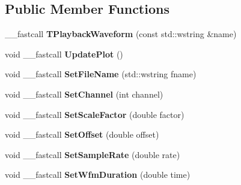 \subsection*{Public Member Functions}
\begin{DoxyCompactItemize}
\item 
\hypertarget{class_t_playback_waveform_aa7c520646204d2c8287fa19096c99172}{\+\_\+\+\_\+fastcall {\bfseries T\+Playback\+Waveform} (const std\+::wstring \&name)}\label{class_t_playback_waveform_aa7c520646204d2c8287fa19096c99172}

\item 
\hypertarget{class_t_playback_waveform_a5aed28140f1fda7df687a83899589e41}{void \+\_\+\+\_\+fastcall {\bfseries Update\+Plot} ()}\label{class_t_playback_waveform_a5aed28140f1fda7df687a83899589e41}

\item 
\hypertarget{class_t_playback_waveform_a3be6b2c54ae80df5df54ac0b1da24d5d}{void \+\_\+\+\_\+fastcall {\bfseries Set\+File\+Name} (std\+::wstring fname)}\label{class_t_playback_waveform_a3be6b2c54ae80df5df54ac0b1da24d5d}

\item 
\hypertarget{class_t_playback_waveform_ae4e5af610750ab71d5ba0beffa2132e4}{void \+\_\+\+\_\+fastcall {\bfseries Set\+Channel} (int channel)}\label{class_t_playback_waveform_ae4e5af610750ab71d5ba0beffa2132e4}

\item 
\hypertarget{class_t_playback_waveform_a277b2f5e1baa0bcc1ae7c6f5b09323a3}{void \+\_\+\+\_\+fastcall {\bfseries Set\+Scale\+Factor} (double factor)}\label{class_t_playback_waveform_a277b2f5e1baa0bcc1ae7c6f5b09323a3}

\item 
\hypertarget{class_t_playback_waveform_aa2fc72ac8982dee01460340c8f837659}{void \+\_\+\+\_\+fastcall {\bfseries Set\+Offset} (double offset)}\label{class_t_playback_waveform_aa2fc72ac8982dee01460340c8f837659}

\item 
\hypertarget{class_t_playback_waveform_a5cbec07e9ce6a16b49e45a31c8a65b41}{void \+\_\+\+\_\+fastcall {\bfseries Set\+Sample\+Rate} (double rate)}\label{class_t_playback_waveform_a5cbec07e9ce6a16b49e45a31c8a65b41}

\item 
\hypertarget{class_t_playback_waveform_a8d869607c56e5f11f32733d192d4a43d}{void \+\_\+\+\_\+fastcall {\bfseries Set\+Wfm\+Duration} (double time)}\label{class_t_playback_waveform_a8d869607c56e5f11f32733d192d4a43d}


\end{DoxyCompactItemize}
